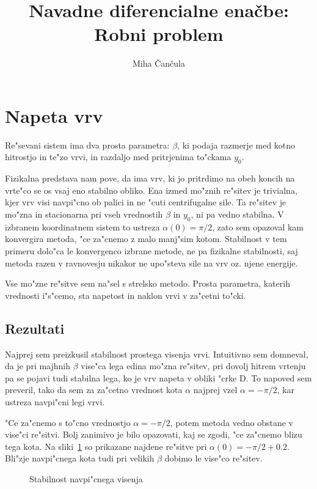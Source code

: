 \documentclass[a4paper,10pt]{article}
\title{Navadne diferencialne ena\v cbe: \\ Robni problem}
\author{Miha \v Can\v cula}
\begin{document}
\maketitle

\section{Napeta vrv}

Re"sevani sistem ima dva prosta parametra: $\beta$, ki podaja razmerje med kotno hitrostjo in te"zo vrvi, in razdaljo med pritrjenima to"ckama $y_0$. 

Fizikalna predstava nam pove, da ima vrv, ki jo pritrdimo na obeh koncih na vrte"co se os vsaj eno stabilno obliko. Ena izmed mo"znih re"sitev je trivialna, kjer vrv visi navpi"cno ob palici in ne "cuti centrifugalne sile. Ta re"sitev je mo"zna in stacionarna pri vseh vrednostih $\beta$ in $y_0$, ni pa vedno stabilna. V izbranem koordinatnem sistem to ustreza $\alpha(0) = \pi/2$, zato sem opazoval kam konvergira metoda, "ce za"cnemo z malo manj"sim kotom. Stabilnost v tem primeru dolo"ca le konvergenco izbrane metode, ne pa fizikalne stabilnosti, saj metoda razen v ravnovesju nikakor ne upo"steva sile na vrv oz. njene energije. 

Vse mo"zne re"sitve sem na"sel s strelsko metodo. Prosta parametra, katerih vrednosti i"s"cemo, sta napetost in naklon vrvi v za"cetni to"cki. 

\subsection{Rezultati}

Najprej sem preizkusil stabilnost prostega visenja vrvi. Intuitivno sem domneval, da je pri majhnih $\beta$ vise"ca lega edina mo"zna re"sitev, pri dovolj hitrem vrtenju pa se pojavi tudi stabilna lega, ko je vrv napeta v obliki "crke D. To napoved sem preveril, tako da sem za za"cetno vrednost kota $\alpha$ najprej vzel $\alpha=-\pi/2$, kar ustreza navpi"cni legi vrvi. 

"Ce za"cnemo s to"cno vrednostjo $\alpha = -\pi/2$, potem metoda vedno obstane v vise"ci re"sitvi. Bolj zanimivo je bilo opazovati, kaj se zgodi, "ce za"cnemo blizu tega kota. Na sliki~\ref{fig:vrv-visenje-05} so prikazane najdene re"sitve pri $\alpha(0) = -\pi/2 + 0.2$. Bli"zje navpi"cnega kota tudi pri velikih $\beta$ dobimo le vise"co re"sitev. 

\begin{figure}[H]
 \centering
 
 \caption{Stabilnost navpi"cnega visenja}
 \label{fig:vrv-visenje-05}
\end{figure}
\end{document}
